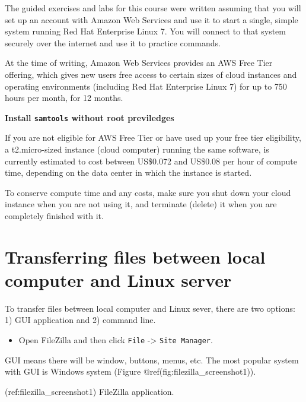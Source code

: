 \documentclass[]{book}
\providecommand{\tightlist}{%
  \setlength{\itemsep}{0pt}\setlength{\parskip}{0pt}}
\theoremstyle{definition}
\theoremstyle{definition}
\theoremstyle{definition}
\theoremstyle{remark}
\let\BeginKnitrBlock\begin \let\EndKnitrBlock\end
\begin{document}
The guided exercises and labs for this course were written assuming that
you will set up an account with Amazon Web Services and use it to start
a single, simple system running Red Hat Enterprise Linux 7. You will
connect to that system securely over the internet and use it to practice
commands.

At the time of writing, Amazon Web Services provides an AWS Free Tier
offering, which gives new users free access to certain sizes of cloud
instances and operating environments (including Red Hat Enterprise Linux
7) for up to 750 hours per month, for 12 months.

\BeginKnitrBlock{rmdtip}
\textbf{Install \texttt{samtools} without root previledges}

If you are not eligible for AWS Free Tier or have used up your free tier
eligibility, a t2.micro-sized instance (cloud computer) running the same
software, is currently estimated to cost between US\$0.072 and US\$0.08
per hour of compute time, depending on the data center in which the
instance is started.

To conserve compute time and any costs, make sure you shut down your
cloud instance when you are not using it, and terminate (delete) it when
you are completely finished with it.
\EndKnitrBlock{rmdtip}

\section{Transferring files between local computer and Linux
server}\label{transferring-files-between-local-computer-and-linux-server}

To transfer files between local computer and Linux sever, there are two
options: 1) GUI application and 2) command line.

\begin{itemize}
\tightlist
\item
  Open FileZilla and then click \texttt{File} -\textgreater{}
  \texttt{Site\ Manager}.
\end{itemize}

GUI means there will be window, buttons, menus, etc. The most popular
system with GUI is Windows system (Figure
@ref(fig:filezilla\_screenshot1)).

(ref:filezilla\_screenshot1) FileZilla application.
\end{document}
